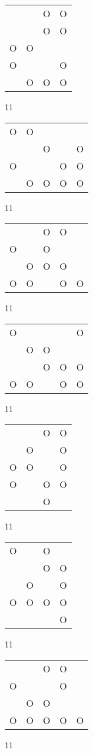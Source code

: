 \begin{tabular}{|m{0.2cm}m{0.2cm}m{0.2cm}m{0.2cm}|}\hline
 & &O&O\\
 & &O&O\\
O&O& & \\
O& & &O\\
 &O&O&O\\
\hline\end{tabular}11
\begin{tabular}{|m{0.2cm}m{0.2cm}m{0.2cm}m{0.2cm}m{0.2cm}|}\hline
O&O& & & \\
 & &O& &O\\
O& & &O&O\\
 &O&O&O&O\\
\hline\end{tabular}11
\begin{tabular}{|m{0.2cm}m{0.2cm}m{0.2cm}m{0.2cm}m{0.2cm}|}\hline
 & &O&O& \\
O& &O& & \\
 &O&O&O& \\
O&O& &O&O\\
\hline\end{tabular}11
\begin{tabular}{|m{0.2cm}m{0.2cm}m{0.2cm}m{0.2cm}m{0.2cm}|}\hline
O& & & &O\\
 &O&O& & \\
 & &O&O&O\\
O&O& &O&O\\
\hline\end{tabular}11
\begin{tabular}{|m{0.2cm}m{0.2cm}m{0.2cm}m{0.2cm}|}\hline
 & &O&O\\
 &O& &O\\
O&O& &O\\
O& &O&O\\
 & &O& \\
\hline\end{tabular}11
\begin{tabular}{|m{0.2cm}m{0.2cm}m{0.2cm}m{0.2cm}|}\hline
O& &O& \\
 & &O&O\\
 &O& &O\\
O&O&O&O\\
 & & &O\\
\hline\end{tabular}11
\begin{tabular}{|m{0.2cm}m{0.2cm}m{0.2cm}m{0.2cm}m{0.2cm}|}\hline
 & &O&O& \\
O& & &O& \\
 &O&O& & \\
O&O&O&O&O\\
\hline\end{tabular}11
